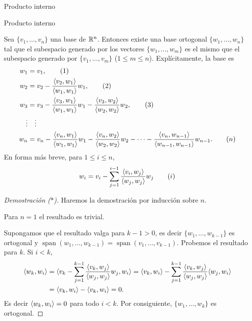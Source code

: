 \begin{chapter}{Producto interno}
\begin{section}{Producto interno}
  
        
        
        
        \begin{proposicion}
            Sea $\{v_1,\ldots,v_n\}$ una base de $\mathbb R^n$. Entonces existe una base ortogonal $\{w_1,\ldots, w_n\}$ tal que el subespacio generado por los vectores $\{w_1,\ldots, w_m\}$ es el mismo que el subespacio generado por $\{v_1,\ldots, v_m\}$ ($1\le m \le n$). Explícitamente, la base es
            \begin{align}
            w_1 &= v_1, \tag{1} \\
            w_2 &= v_2 - \frac{\langle v_2,w_1\rangle}{\langle w_1,w_1\rangle}w_1, \tag{2}\\
            w_3 &= v_3 - \frac{\langle v_3,w_1\rangle}{\langle w_1,w_1\rangle}w_1- \frac{\langle v_3,w_2\rangle}{\langle w_2,w_2\rangle}w_2,\tag{3} \\
            \vdots &\quad \vdots \notag \\
            w_n &= v_n - \frac{\langle v_n,w_1\rangle}{\langle w_1,w_1\rangle}w_1- \frac{\langle v_n,w_2\rangle}{\langle w_2,w_2\rangle}w_2 - \cdots - \frac{\langle v_n,w_{n-1}\rangle}{\langle w_{n-1},w_{n-1}\rangle}w_{n-1}.\tag{$n$}	
            \end{align}
            En forma más breve, para $1 \le i \le n$, 
            \begin{equation}
            w_i = v_i - \sum_{j = 1}^{i-1} \frac{\langle v_i,w_{j}\rangle}{\langle w_{j},w_{j}\rangle}w_{j} \tag{$i$}
            \end{equation}
        \end{proposicion} 
        \begin{proof}[Demostración ($*$)]
            
            
            Haremos la demostración por inducción sobre $n$. 
            
            Para $n= 1$ el resultado es trivial.
            
            Supongamos que el resultado valga para $k-1>0$, es decir  $\{w_1,\ldots, w_{k-1}\}$ es ortogonal y 
            $\operatorname{span}(w_1,\ldots, w_{k-1}) = \operatorname{span}(v_1,\ldots, v_{k-1})$. Probemos el resultado para $k$.  Si  $i < k$, 
            \begin{align*}
            \langle w_k, w_i \rangle &= \langle  v_k - \sum_{j = 1}^{k-1} \frac{\langle v_k,w_{j}\rangle}{\langle w_{j},w_{j}\rangle}w_{j} , w_i \rangle 
            = \langle v_k, w_i\rangle -  \sum_{j = 1}^{k-1} \frac{\langle v_k,w_{j}\rangle}{\langle w_{j},w_{j}\rangle}\langle w_{j} , w_i \rangle \\
            &=  \langle v_k, w_i\rangle -  \langle v_k, w_i\rangle = 0.
            \end{align*}
            Es decir $	\langle w_k, w_i \rangle =0$ para todo $i < k$. Por consiguiente,  $\{w_1,\ldots, w_{k}\}$ es ortogonal.
            

\end{proof}
\end{section}
\end{chapter}
